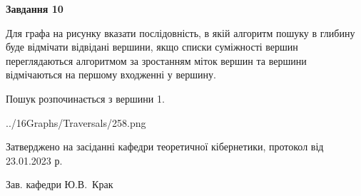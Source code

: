 \documentclass[12pt, ukrainian]{article}
\begin{document}
{\begin {large}
{\begin {center}\textbf{Завдання 10}\end {center}}\par
Для графа на рисунку вказати послідовність, в якій алгоритм пошуку в глибину буде відмічати відвідані вершини, якщо списки суміжності вершин переглядаються алгоритмом за зростанням міток вершин та вершини відмічаються на першому вход\-женні у вершину.\par
Пошук розпочинається з вершини 1.\par

\begin{center}
	{../16Graphs/Traversals/258.png}
\end{center}\par
\newpage


\end {large}
}
{\smallskip \begin {small} Затверджено на засіданні кафедри теоретичної кібернетики, протокол  від   23.01.2023 р.\par\smallskip\smallskip
{\parbox {6.5 cm}{Зав. кафедри \dotfill Ю.В.~Крак}} \end{small}}
\end{document}
